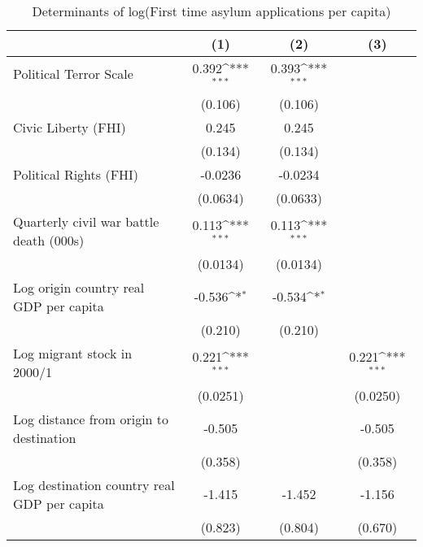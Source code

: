 \begin{table}[htbp]\centering
\def\sym#1{\ifmmode^{#1}\else\(^{#1}\)\fi}
\caption{Determinants of log(First time asylum applications per capita)}
\begin{tabular}{l*{3}{c}}
\hline\hline
                    &\multicolumn{1}{c}{(1)}         &\multicolumn{1}{c}{(2)}         &\multicolumn{1}{c}{(3)}         \\
\hline
Political Terror Scale&       0.392\sym{***}&       0.393\sym{***}&                     \\
                    &     (0.106)         &     (0.106)         &                     \\
[1em]
Civic Liberty (FHI) &       0.245         &       0.245         &                     \\
                    &     (0.134)         &     (0.134)         &                     \\
[1em]
Political Rights (FHI)&     -0.0236         &     -0.0234         &                     \\
                    &    (0.0634)         &    (0.0633)         &                     \\
[1em]
Quarterly civil war battle death (000s)&       0.113\sym{***}&       0.113\sym{***}&                     \\
                    &    (0.0134)         &    (0.0134)         &                     \\
[1em]
Log origin country real GDP per capita&      -0.536\sym{*}  &      -0.534\sym{*}  &                     \\
                    &     (0.210)         &     (0.210)         &                     \\
[1em]
Log migrant stock in 2000/1&       0.221\sym{***}&                     &       0.221\sym{***}\\
                    &    (0.0251)         &                     &    (0.0250)         \\
[1em]
Log distance from origin to destination&      -0.505         &                     &      -0.505         \\
                    &     (0.358)         &                     &     (0.358)         \\
[1em]
Log destination country real GDP per capita&      -1.415         &      -1.452         &      -1.156         \\
                    &     (0.823)         &     (0.804)         &     (0.670)         \\

\end{tabular}
\end{table}
